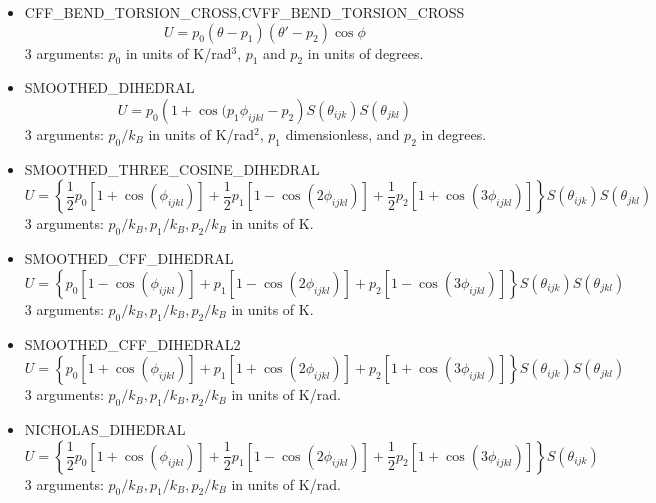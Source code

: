 \begin{itemize}
  \item{CFF\_BEND\_TORSION\_CROSS,CVFF\_BEND\_TORSION\_CROSS}\\
  \begin{equation}
  U=p_0\left(\theta-p_1\right)\left(\theta'-p_2\right)\cos\phi
  \end{equation}
  3 arguments: $p_0$ in units of K/rad$^3$, $p_1$ and $p_2$ in units of degrees.
\item{SMOOTHED\_DIHEDRAL}
  \begin{equation}
  U=p_0\left(1+\cos(p_1\phi_{ijkl}-p_2\right)S\left(\theta_{ijk}\right)S\left(\theta_{jkl}\right)
  \end{equation}
  3 arguments: $p_0/k_B$ in units of K/rad$^2$, $p_1$ dimensionless, and  $p_2$ in degrees.

\item{SMOOTHED\_THREE\_COSINE\_DIHEDRAL}
  \begin{equation}
  U=\left\{\frac{1}{2}p_0\left[1+\cos\left(\phi_{ijkl}\right)\right]+
    \frac{1}{2}p_1\left[1-\cos\left(2\phi_{ijkl}\right)\right]+
    \frac{1}{2}p_2\left[1+\cos\left(3\phi_{ijkl}\right)\right]\right\}
    S\left(\theta_{ijk}\right)S\left(\theta_{jkl}\right)
  \end{equation}
  3 arguments: $p_0/k_B,p_1/k_B,p_2/k_B$ in units of K.

\item{SMOOTHED\_CFF\_DIHEDRAL}
  \begin{equation}
  U=\left\{p_0\left[1-\cos\left(\phi_{ijkl}\right)\right]+
    p_1\left[1-\cos\left(2\phi_{ijkl}\right)\right]+
    p_2\left[1-\cos\left(3\phi_{ijkl}\right)\right]\right\}
    S\left(\theta_{ijk}\right)S\left(\theta_{jkl}\right)
  \end{equation}
  3 arguments: $p_0/k_B,p_1/k_B,p_2/k_B$ in units of K.

\item{SMOOTHED\_CFF\_DIHEDRAL2}
  \begin{equation}
  U=\left\{p_0\left[1+\cos\left(\phi_{ijkl}\right)\right]+
    p_1\left[1+\cos\left(2\phi_{ijkl}\right)\right]+
    p_2\left[1+\cos\left(3\phi_{ijkl}\right)\right]\right\}
    S\left(\theta_{ijk}\right)S\left(\theta_{jkl}\right)
  \end{equation}
  3 arguments: $p_0/k_B,p_1/k_B,p_2/k_B$ in units of K/rad.

\item{NICHOLAS\_DIHEDRAL}
 \begin{equation}
  U=\left\{\frac{1}{2}p_0\left[1+\cos\left(\phi_{ijkl}\right)\right]+
    \frac{1}{2}p_1\left[1-\cos\left(2\phi_{ijkl}\right)\right]+
    \frac{1}{2}p_2\left[1+\cos\left(3\phi_{ijkl}\right)\right]\right\}
    S\left(\theta_{ijk}\right)
  \end{equation}
  3 arguments: $p_0/k_B,p_1/k_B,p_2/k_B$ in units of K/rad.


\end{itemize}
